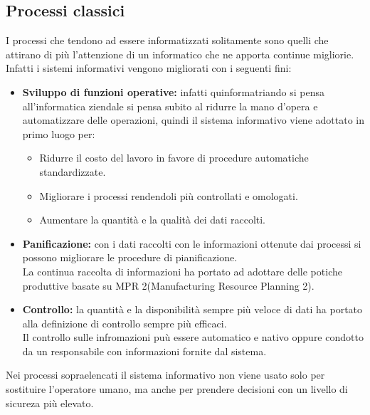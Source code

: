 \documentclass{book}
\begin{document}
    \subsection{Processi classici}
    I processi che tendono ad essere informatizzati solitamente sono quelli che attirano di più l'attenzione di un informatico che ne apporta continue migliorie.\\
    Infatti i sistemi informativi vengono migliorati con i seguenti fini:
    \begin{itemize}
        \item \textbf{Sviluppo di funzioni operative:} infatti quinformatriando si pensa all'informatica ziendale si pensa subito al ridurre la mano d'opera e automatizzare delle operazioni, quindi il sistema informativo viene adottato in primo luogo per:
        \begin{itemize}
            \item Ridurre il costo del lavoro in favore di procedure automatiche standardizzate.
            \item Migliorare i processi rendendoli più controllati e omologati.
            \item Aumentare la quantità e la qualità dei dati raccolti.
        \end{itemize}
        \item \textbf{Panificazione:} con i dati raccolti con le informazioni ottenute dai processi si possono migliorare le procedure di pianificazione.\\
            La continua raccolta di informazioni ha portato ad adottare delle potiche produttive basate su MPR 2(Manufacturing Resource Planning 2).
        \item \textbf{Controllo:} la quantità e la disponibilità sempre più veloce di dati ha portato alla definizione di controllo sempre più efficaci.\\
            Il controllo sulle infromazioni puù essere automatico e nativo oppure condotto da un responsabile con informazioni fornite dal sistema.
    \end{itemize}
    Nei processi sopraelencati il sistema informativo non viene usato solo per sostituire l'operatore umano, ma anche per prendere decisioni con un livello di sicureza più elevato.
\end{document}

